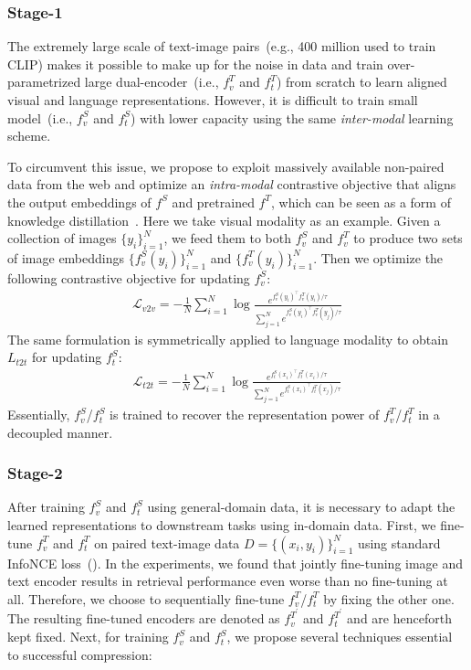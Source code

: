 \subsubsection{Stage-1}
\label{stage1}
The extremely large scale of text-image pairs~(e.g., 400 million used to train CLIP) makes it possible to make up for the noise in data and train over-parametrized large dual-encoder~(i.e., $f_v^{T}$ and $f_t^{T}$) from scratch to learn aligned visual and language representations. However, it is difficult to train small model~(i.e., $f_v^{S}$ and $f_t^{S}$) with lower capacity using the same \textit{inter-modal} learning scheme.

To circumvent this issue, we propose to exploit massively available non-paired data from the web and optimize an \textit{intra-modal} contrastive objective that aligns the output embeddings of $f^{S}$ and pretrained $f^{T}$, which can be seen as a form of knowledge distillation~\cite{hinton2015distilling}. Here we take visual modality as an example. Given a collection of images $\{y_i\}_{i=1}^N$, we feed them to both $f_v^{S}$ and $f_v^{T}$ to produce two sets of image embeddings $\{f_v^{S}(y_i)\}_{i=1}^{N}$ and $\{f_v^{T}(y_i)\}_{i=1}^{N}$. Then we optimize the following contrastive objective for updating $f_v^{S}$:
\begin{align}
	\mathcal{L}_{v2v}=-\frac{1}{N}\sum_{i=1}^{N}\log{\frac{e^{f_v^{S}(y_i)^\top f_v^{T}(y_i)/\tau}}{\sum_{j=1}^{N}e^{f_v^{S}(y_i)^\top f_v^{T}(y_j)/\tau}}}
\end{align}
The same formulation is symmetrically applied to language modality to obtain $L_{t2t}$ for updating $f_t^{S}$:
\begin{align}
	\mathcal{L}_{t2t}=-\frac{1}{N}\sum_{i=1}^{N}\log{\frac{e^{f_t^{S}(x_i)^\top f_t^{T}(x_i)/\tau}}{\sum_{j=1}^{N}e^{f_t^{S}(x_i)^\top f_t^{T}(x_j)/\tau}}}
\end{align}
Essentially, $f_v^{S}$/$f_t^{S}$ is trained to recover the representation power of $f_v^{T}$/$f_t^{T}$ in a decoupled manner.

\subsubsection{Stage-2}
\label{stage2}
After training $f_v^{S}$ and $f_t^{S}$ using general-domain data, 
it is necessary to adapt the learned representations to downstream tasks 
using in-domain data. First, we fine-tune $f_v^{T}$ and $f_t^{T}$ on paired 
text-image data $D=\{(x_i, y_i)\}_{i=1}^{N}$ using standard InfoNCE loss~(). In the experiments, we found that jointly fine-tuning image 
and text encoder results in retrieval performance even worse than no fine-tuning at all. 
Therefore, we choose to sequentially fine-tune $f_v^{T}$/$f_t^{T}$ by fixing the other one. The resulting fine-tuned encoders are denoted as $f_v^{T^{\prime}}$ and $f_t^{T^{\prime}}$ and are henceforth kept fixed. Next, for training $f_v^{S}$ and $f_t^{S}$, we propose several techniques  essential to successful compression:

